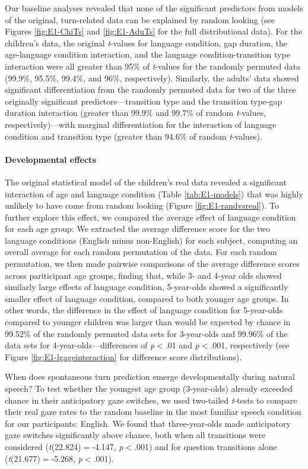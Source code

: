 \documentclass[authoryear, 12pt]{elsarticle}
\begin{document}
Our baseline analyses revealed that none of the significant predictors from models of the original, turn-related data can be explained by random looking (see Figures \ref{fig:E1-ChiTs} and \ref{fig:E1-AduTs} for the full distributional data). For the children's data, the original \textit{t}-values for language condition, gap duration, the age-language condition interaction, and the language condition-transition type interaction were all greater than 95\% of \textit{t}-values for the randomly permuted data (99.9\%, 95.5\%, 99.4\%, and 96\%, respectively). Similarly, the adults' data showed significant differentiation from the randomly permuted data for two of the three originally significant predictors---transition type and the transition type-gap duration interaction (greater than 99.9\% and 99.7\% of random \textit{t}-values, respectively)---with marginal differentiation for the interaction of language condition and transition type (greater than 94.6\% of random \textit{t}-values).

\paragraph{Developmental effects}
The original statistical model of the children's real data revealed a significant interaction of age and language condition (Table \ref{tab:E1-models}) that was highly unlikely to have come from random looking (Figure \ref{fig:E1-randvsreal}). To further explore this effect, we compared the average effect of language condition for each age group: We extracted the average difference score for the two language conditions (English minus non-English) for each subject, computing an overall average for each random permutation of the data. For each random permutation, we then made pairwise comparisons of the average difference scores across pariticipant age groups, finding that, while 3- and 4-year olds showed similarly large effects of language condition, 5-year-olds showed a significantly smaller effect of language condition, compared to both younger age groups. In other words, the difference in the effect of language condition for 5-year-olds compared to younger children was larger than would be expected by chance in 99.52\% of the randomly permuted data sets for 3-year-olds and 99.96\% of the data sets for 4-year-olds---differences of \textit{p}$<$.01 and \textit{p}$<$.001, respectively (see Figure \ref{fig:E1-lgageinteraction} for difference score distributions).

When does spontaneous turn prediction emerge developmentally during natural speech? To test whether the youngest age group (3-year-olds) already exceeded chance in their anticipatory gaze switches, we used two-tailed \textit{t}-tests to compare their real gaze rates to the random baseline in the most familiar speech condition for our participants: English. We found that three-year-olds made anticipatory gaze switches significantly above chance, both when all transitions were considered (\textit{t}(22.824)$=$-4.147, \textit{p}$<$.001) and for question transitions alone (\textit{t}(21.677)$=$-5.268, \textit{p}$<$.001).
\end{document}
